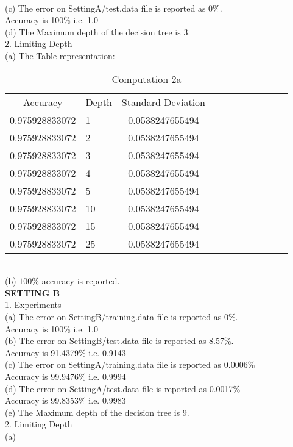 \documentclass{article}
\begin{document}
\\(c) The error on SettingA/test.data file is reported as 0\%. \\Accuracy is 100\% i.e. 1.0
\\(d) The Maximum depth of the decision tree is 3.
\\[50pt]
2. Limiting Depth
\\(a) The Table representation:
\begin{table}[h]
\centering
\caption{Computation 2a}
\begin{tabular} {clclclclclc}
Accuracy & Depth & Standard Deviation \\
0.975928833072 & 1 & 0.0538247655494 \\
0.975928833072 & 2 & 0.0538247655494 \\
0.975928833072 & 3 & 0.0538247655494 \\
0.975928833072 & 4 & 0.0538247655494 \\
0.975928833072 & 5 & 0.0538247655494 \\
0.975928833072 & 10 & 0.0538247655494 \\
0.975928833072 & 15 & 0.0538247655494 \\
0.975928833072 & 25 & 0.0538247655494 \\
  \end{tabular}
\end{table}
\\(b) $100\%$ accuracy is reported.
\\[10pt]
\textbf {SETTING B}
\\1. Experiments
\\(a) The error on SettingB/training.data file is reported as 0\%. \\Accuracy is 100\% i.e. 1.0
\\(b) The error on SettingB/test.data file is reported as 8.57\%. \\ Accuracy is 91.4379\% i.e. 0.9143
\\(c) The error on SettingA/training.data file is reported as 0.0006\% \\Accuracy is 99.9476\% i.e. 0.9994 
\\(d) The error on SettingA/test.data file is reported as 0.0017\% \\Accuracy is 99.8353\% i.e. 0.9983
\\(e) The Maximum depth of the decision tree is 9.
\\[10pt]
2. Limiting Depth
\\(a)
\end{document}
